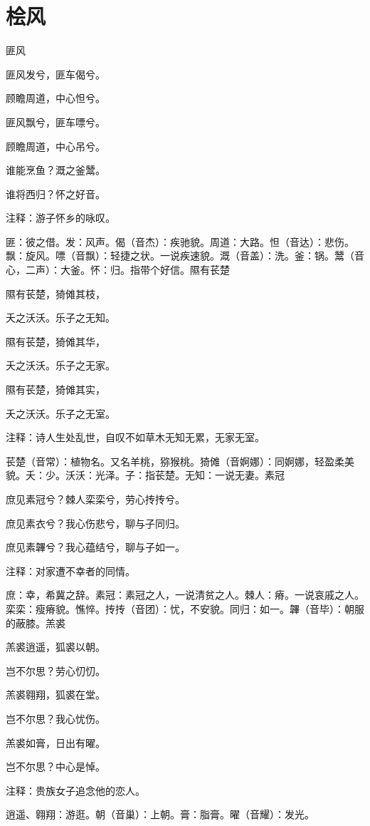 \documentclass[12pt,UTF8]{ctexbook}
\begin{document}
\part{桧风}

匪风

匪风发兮，匪车偈兮。

顾瞻周道，中心怛兮。

匪风飘兮，匪车嘌兮。

顾瞻周道，中心吊兮。

谁能烹鱼？溉之釜鬵。

谁将西归？怀之好音。

注释：游子怀乡的咏叹。

匪：彼之借。发：风声。偈（音杰）：疾驰貌。周道：大路。怛（音达）：悲伤。飘：旋风。嘌（音飘）：轻捷之状。一说疾速貌。溉（音盖）：洗。釜：锅。鬵（音心，二声）：大釜。怀：归。指带个好信。隰有苌楚

隰有苌楚，猗傩其枝，

夭之沃沃。乐子之无知。

隰有苌楚，猗傩其华，

夭之沃沃。乐子之无家。

隰有苌楚，猗傩其实，

夭之沃沃。乐子之无室。

注释：诗人生处乱世，自叹不如草木无知无累，无家无室。

苌楚（音常）：植物名。又名羊桃，猕猴桃。猗傩（音婀娜）：同婀娜，轻盈柔美貌。夭：少。沃沃：光泽。子：指苌楚。无知：一说无妻。素冠

庶见素冠兮？棘人栾栾兮，劳心抟抟兮。

庶见素衣兮？我心伤悲兮，聊与子同归。

庶见素韠兮？我心蕴结兮，聊与子如一。

注释：对家遭不幸者的同情。

庶：幸，希冀之辞。素冠：素冠之人，一说清贫之人。棘人：瘠。一说哀戚之人。栾栾：瘦瘠貌。憔悴。抟抟（音团）：忧，不安貌。同归：如一。韠（音毕）：朝服的蔽膝。羔裘

羔裘逍遥，狐裘以朝。

岂不尔思？劳心忉忉。

羔裘翱翔，狐裘在堂。

岂不尔思？我心忧伤。

羔裘如膏，日出有曜。

岂不尔思？中心是悼。

注释：贵族女子追念他的恋人。

逍遥、翱翔：游逛。朝（音巢）：上朝。膏：脂膏。曜（音耀）：发光。
\end{document}
